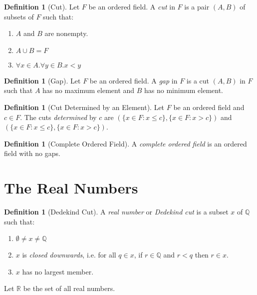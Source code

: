 \documentclass{article}
\theoremstyle{definition}
\newtheorem{definition}[axiom]{Definition}
\begin{document}
    \begin{definition}[Cut]
        Let $F$ be an ordered field. A \emph{cut} in $F$ is a pair $(A,B)$ of subsets of $F$ such that:
        \begin{enumerate}
            \item $A$ and $B$ are nonempty.
            \item $A \cup B = F$
            \item $\forall x \in A. \forall y \in B. x < y$
        \end{enumerate}
    \end{definition}

    \begin{definition}[Gap]
        Let $F$ be an ordered field. A \emph{gap} in $F$ is a cut $(A,B)$ in $F$ such that $A$ has no
        maximum element and $B$ has no minimum element.
    \end{definition}

    \begin{definition}[Cut Determined by an Element]
        Let $F$ be an ordered field and $c \in F$. The cuts \emph{determined} by $c$ are
        $(\{ x \in F : x \leq c \}, \{ x \in F : x > c \})$ and $(\{ x \in F : x \leq c \}, \{ x \in F : x > c \})$.
    \end{definition}

    \begin{definition}[Complete Ordered Field]
        A \emph{complete ordered field} is an ordered field with no gaps.
    \end{definition}
    \section{The Real Numbers}

    \begin{definition}[Dedekind Cut]
        A \emph{real number} or \emph{Dedekind cut} is a subset $x$ of $\mathbb{Q}$ such that:
        \begin{enumerate}
            \item $\emptyset \neq x \neq \mathbb{Q}$
            \item $x$ is \emph{closed downwards}, i.e. for all $q \in x$, if $r \in \mathbb{Q}$
            and $r < q$ then $r \in x$.
            \item $x$ has no largest member.
        \end{enumerate}
        Let $\mathbb{R}$ be the set of all real numbers.
    \end{definition}
\end{document}
